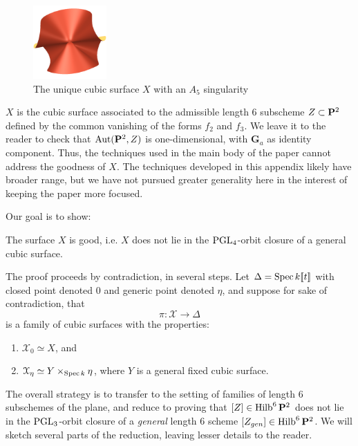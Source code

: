 \documentclass[12pt,reqno]{amsart}
\renewcommand{\k}{k}
\DeclareMathOperator{\Hilb}{Hilb}
\renewcommand{\to}{{\longrightarrow}}
\numberwithin{equation}{section}
\newcommand{\G}{\mathbf G}
\begin{document}
\begin{figure}
  \centering
  \includegraphics[width=0.25\textwidth]{cubicA5}
  \caption{The unique cubic surface $X$ with an $A_5$ singularity}
  \label{figure:cubicA5}
\end{figure}

$X$ is the cubic surface associated to the admissible length $6$
subscheme $Z \subset \P^{2}$ defined by the common vanishing of the
forms $f_{2}$ and $f_{3}$. We leave it to the reader to check that
$\Aut(\P^{2},Z)$ is one-dimensional, with $\G_{a}$ as identity
component.  Thus, the techniques used in the main body of the paper
cannot address the goodness of $X$.  The techniques developed in this
appendix likely have broader range, but we have not pursued greater
generality here in the interest of keeping the paper more focused.


Our goal is to show:

\begin{theorem}
  \label{theorem:A5good} The surface $X$ is good, i.e. $X$ does not
  lie in the $\PGL_4$-orbit closure of a general cubic surface.
\end{theorem}

The proof proceeds by contradiction, in several steps. Let
$\Delta = \spec \k [\![t]\!]$ with closed point denoted $0$ and generic
point denoted $\eta$, and suppose for sake of contradiction, that
\[\pi: \mathcal{X} \to \Delta\]
is a family of cubic surfaces with the properties:
\begin{enumerate}
\item $\mathcal{X}_{0} \simeq X$, and\\
\item $\mathcal{X}_{\eta} \simeq Y \times_{\spec \k} \eta$, where $Y$ is a
  general fixed cubic surface.
\end{enumerate}

The overall strategy is to transfer to the setting of families of
length $6$ subschemes of the plane, and reduce to proving that
$[Z] \in \Hilb^{6}\P^{2}$ does not lie in the $\PGL_3$-orbit closure
of a {\sl general} length $6$ scheme $[Z_{gen}] \in \Hilb^{6}\P^{2}$.
We will sketch several parts of the reduction, leaving lesser details
to the reader.
\end{document}
